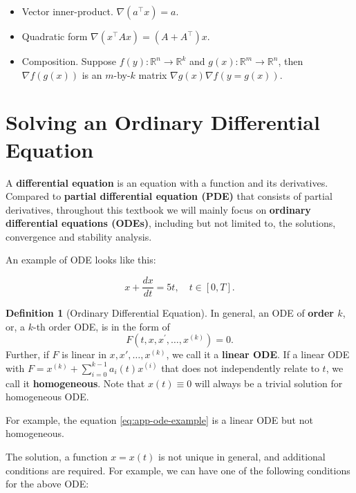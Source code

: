 \documentclass[
]{book}
\theoremstyle{definition}
\newtheorem{definition}{Definition}[chapter]
\theoremstyle{definition}
\theoremstyle{definition}
\theoremstyle{definition}
\theoremstyle{remark}
\begin{document}
\begin{itemize}
\item
  Vector inner-product. \(\nabla(a^\top x)=a\).
\item
  Quadratic form \(\nabla(x^\top Ax) = (A+A^\top)x\).
\item
  Composition. Suppose \(f(y):\mathbb{R}^{n}\rightarrow \mathbb{R}^k\) and \(g(x):\mathbb{R}^{m}\rightarrow \mathbb{R}^n\), then \(\nabla f(g(x))\) is an \(m\)-by-\(k\) matrix \(\nabla g(x) \nabla f(y=g(x))\).
\end{itemize}

\hypertarget{solving-an-ordinary-differential-equation}{%
\section{Solving an Ordinary Differential Equation}\label{solving-an-ordinary-differential-equation}}

A \textbf{differential equation} is an equation with a function and its derivatives. Compared to \textbf{partial differential equation (PDE)} that consists of partial derivatives, throughout this textbook we will mainly focus on \textbf{ordinary differential equations (ODEs)}, including but not limited to, the solutions, convergence and stability analysis.

An example of ODE looks like this:

\begin{equation}
x+\frac{dx}{dt}=5t,\quad t\in[0,T].
\label{eq:app-ode-example}
\end{equation}

\begin{definition}[Ordinary Differential Equation]
\protect\hypertarget{def:ode}{}\label{def:ode}In general, an ODE of \textbf{order \(k\)}, or, a \(k\)-th order ODE, is in the form of
\[ F(t, x, x^\prime, \ldots, x^{(k)})=0.\]
Further, if \(F\) is linear in \(x,x',\ldots,x^{(k)}\), we call it a \textbf{linear ODE}. If a linear ODE with \(F=x^{(k)} + \sum_{i=0}^{k-1}a_i(t)x^{(i)}\) that does not independently relate to \(t\), we call it \textbf{homogeneous}. Note that \(x(t)\equiv 0\) will always be a trivial solution for homogeneous ODE.
\end{definition}

For example, the equation \eqref{eq:app-ode-example} is a linear ODE but not homogeneous.

The solution, a function \(x=x(t)\) is not unique in general, and additional conditions are required. For example, we can have one of the following conditions for the above ODE:
\end{document}
